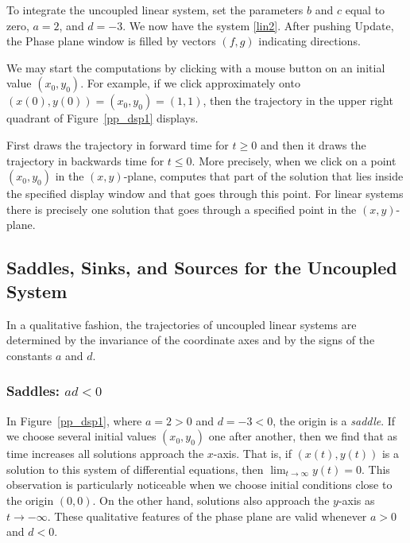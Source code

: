 \documentclass{ximera}
\begin{document}
To integrate the uncoupled linear system, set the parameters $b$
and $c$ equal to zero, $a = 2$, and $d = -3$. We now have the system \eqref{lin2}.  
After pushing {\sf Update}, the {\sf Phase plane} window is filled by vectors $(f,g)$ indicating 
directions.

We may start the computations by clicking
with a mouse button on an initial value $(x_0,y_0)$.  For example,
if we click approximately onto $(x(0),y(0))=(x_0,y_0)=(1,1)$, then
the trajectory in the upper right quadrant of
Figure~\ref{pp_dsp1} displays.

\begin{figure*}[htb]
     \centerline{%
     }
     \caption{{\sf \PPLANE\ Display} for \protect\eqref{lin2} with
             $a=2$, $d=-3$ and $x,y\in [-5,5]$. Solutions
             going through $(\pm 1,\pm 1)$ are shown.}
     \label{pp_dsp1}
\end{figure*}

First {\pplane} draws the trajectory in forward time for
$t\ge 0$ and then it draws the trajectory in backwards time for
$t\le 0$.  More precisely, when we click on a point $(x_0,y_0)$ in
the $(x,y)$-plane, {\pplane} computes that part of the
solution that lies inside the specified {\sf display window}
and that goes through this point.  For linear systems there is
precisely one solution that goes through a specified point in
the $(x,y)$-plane. 

\subsection*{Saddles, Sinks, and Sources for the Uncoupled System \protect{\eqref{lin2}}}

In a qualitative fashion, the trajectories of uncoupled linear
systems are determined by the invariance of the coordinate axes
and by the signs of the constants $a$ and $d$.

\subsubsection*{Saddles: $ad<0$} 

In Figure~\ref{pp_dsp1}, where $a=2>0$ and $d=-3<0$, the origin is a
{\em saddle\/}.  If we choose several initial values $(x_0,y_0)$
one after another,  then we find that as time increases all
solutions approach the $x$-axis.  That is, if $(x(t),y(t))$ is a 
solution to this system of differential equations, then 
$\lim_{t\to\infty}y(t)=0$.  This observation is particularly 
noticeable when we choose initial conditions close to the origin $(0,0)$.  
On the other hand, solutions also approach the $y$-axis as $t\to-\infty$.
These qualitative features of the phase plane are valid whenever 
$a>0$ and $d<0$.
 
\end{document}

